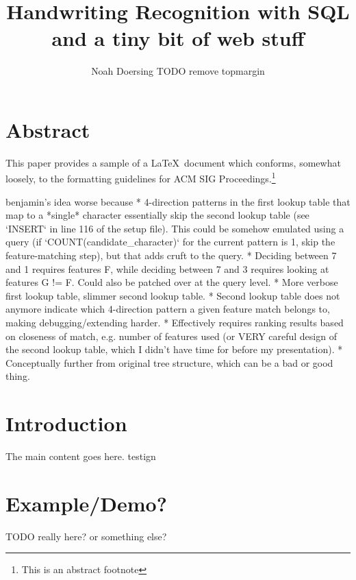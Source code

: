 \documentclass[sigconf]{acmart}
\begin{document}
\title{Handwriting Recognition with SQL\\\hspace{6.88cm}\footnotesize and a tiny bit of web stuff}
\author{Noah Doersing TODO remove topmargin}
\affiliation{}

\maketitle

\section*{Abstract}
This paper provides a sample of a \LaTeX\ document which conforms, somewhat loosely, to the formatting guidelines for ACM SIG Proceedings.\footnote{This is an abstract footnote}

benjamin's idea worse because
* 4-direction patterns in the first lookup table that map to a *single* character essentially skip the second lookup table (see `INSERT` in line 116 of the setup file). This could be somehow emulated using a query (if `COUNT(candidate\_character)` for the current pattern is 1, skip the feature-matching step), but that adds cruft to the query.
* Deciding between 7 and 1 requires features F, while deciding between 7 and 3 requires looking at features G != F. Could also be patched over at the query level.
* More verbose first lookup table, slimmer second lookup table.
* Second lookup table does not anymore indicate which 4-direction pattern a given feature match belongs to, making debugging/extending harder.
* Effectively requires ranking results based on closeness of match, e.g. number of features used (or VERY careful design of the second lookup table, which I didn't have time for before my presentation).
* Conceptually further from original tree structure, which can be a bad or good thing.

\section{Introduction}

The main content goes here. testign

\section{Example/Demo?}

TODO really here? or something else?
\end{document}
